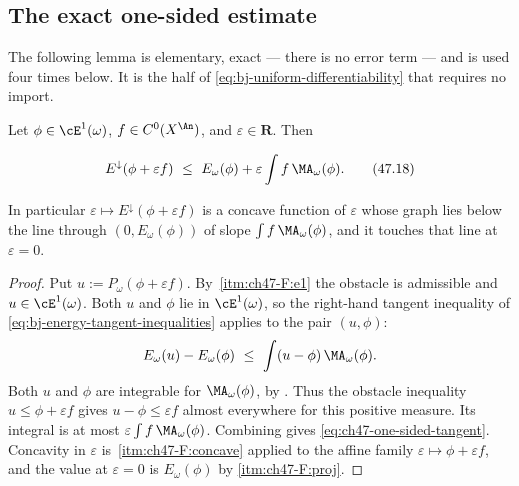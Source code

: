 \subsection{The exact one-sided estimate}
\label{sec:ch47-one-sided}

The following lemma is elementary, exact --- there is no error term --- and
is used four times below.  It is the half of
\eqref{eq:bj-uniform-differentiability} that requires no import.

\begin{lemma}
\label{lem:ch47-one-sided-tangent}
Let $\phi\in\cE^1(\omega)$, $f\in C^0(X^{\An})$, and
$\varepsilon\in\mathbf R$.  Then

\[
 E^\downarrow(\phi+\varepsilon f)\ \le\
 E_\omega(\phi)+\varepsilon\int f\,\MA_\omega(\phi).
\tag{47.18}\label{eq:ch47-one-sided-tangent}
\]

In particular $\varepsilon\mapsto E^\downarrow(\phi+\varepsilon f)$ is a
concave function of $\varepsilon$ whose graph lies below the line through
$(0,E_\omega(\phi))$ of slope $\int f\,\MA_\omega(\phi)$, and it touches
that line at $\varepsilon=0$.
\end{lemma}

\begin{proof}
Put $u:=P_\omega(\phi+\varepsilon f)$.  By
\,\cref{itm:ch47-F:e1} the obstacle is
admissible and $u\in\cE^1(\omega)$.  Both $u$ and $\phi$ lie in
$\cE^1(\omega)$, so the right-hand tangent inequality of
\eqref{eq:bj-energy-tangent-inequalities} applies to the pair
$(u,\phi)$:
\[
 E_\omega(u)-E_\omega(\phi)\ \le\ \int(u-\phi)\,\MA_\omega(\phi).
\]
Both $u$ and $\phi$ are integrable for $\MA_\omega(\phi)$, by
. Thus the obstacle inequality
$u\le\phi+\varepsilon f$ gives
$u-\phi\le\varepsilon f$ almost everywhere for this positive measure.
Its integral is at most $\varepsilon\int f\,\MA_\omega(\phi)$.  Combining gives
\eqref{eq:ch47-one-sided-tangent}.  Concavity in $\varepsilon$ is
\Cref{prop:ch47-F-elementary}\,\cref{itm:ch47-F:concave} applied to the
affine family $\varepsilon\mapsto\phi+\varepsilon f$, and the value at
$\varepsilon=0$ is $E_\omega(\phi)$ by
\cref{itm:ch47-F:proj}.
\end{proof}

